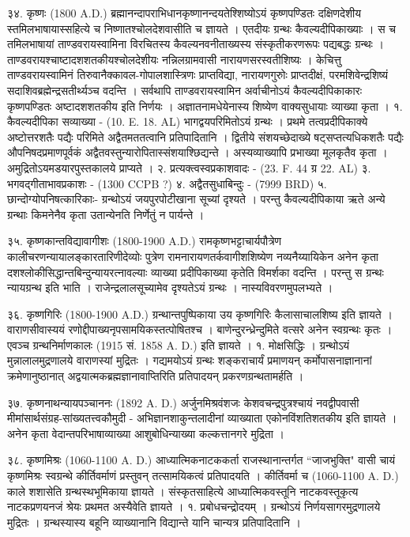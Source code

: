 ३४. कृष्णः (1800 A.D.)
ब्रह्मानन्दापराभिधानकृष्णानन्दयतेश्शिष्योऽयं कृष्णपण्डितः दक्षिणदेशीय स्तमिलभाषायास्सहित्ये च निष्णातश्चोलदेशवासीति च ज्ञायते । एतदीयः ग्रन्थः कैवल्यदीपिकाख्याः
 । स च तमिलभाषायां ताण्डवरायस्वामिना विरचितस्य कैवल्यनवनीताख्यस्य संस्कृतीकरणरूपः पद्यबद्धः ग्रन्थः ।
ताण्डवरायश्चाष्टादशशतकीयश्चोलदेशीयः नन्निलग्रामवासी नारायणसरस्वतीशिष्यः । केचित्तु ताण्डवरायस्वामिनं तिरुवानैक्कावल-गोपालशास्त्रिणः प्राप्तविद्या, नारायणगुरुोः प्राप्तदीक्षं, परमशिवेन्द्रशिष्यं सदाशिवब्रह्मेन्द्रसतीर्थ्यञ्च वदन्ति । सर्वथापि ताण्डवरायस्वामिन अर्वाचीनोऽयं कैवल्यदीपिकाकारः कृष्णपण्डितः अष्टादशशतकीय इति निर्णयः । अज्ञातनामधेयेनास्य शिष्येण वाक्यसुधायाः व्याख्या कृता ।
१. कैवल्यदीपिका सव्याख्या - (10. E. 18. AL)
भागद्वयपरिमितोऽयं ग्रन्थः । प्रथमे तत्वप्रदीपिकाक्ये अष्टोत्तरशतैः पद्यैः परिमिते अद्वैतमततत्वानि प्रतिपादितानि । द्वितीये संशयच्छेदाख्ये षट्सप्तत्यधिकशतैः पद्यैः औपनिषदप्रमाणपूर्वकं अद्वैतवस्तुन्यारोपितास्संशयाश्छिद्यन्ते । अस्यव्याख्यापि प्रभाख्या मूलकृतैव कृता । अमुद्रितोऽयमडयारपुस्तकालये प्राप्यते । 
२. प्रत्यक्त्वस्वप्रकाशवादः - (23. F. 44 ग्र 22. AL)
३. भगवद्गीताभावप्रकाशः - (1300 CCPB ?)
४. अद्वैतसुधाबिन्दुः - (7999 BRD)
५. छान्दोग्योपनिषत्कारिकाः-
ग्रन्थोऽयं जयपुरपोटीखाना सूच्यां दृश्यते । परन्तु कैवल्यदीपिकाया ऋते अन्ये ग्रन्थाः किमनेनैव कृता उतान्येनति निर्णेतुं न पार्यन्ते ।

३५. कृष्णकान्तविद्यावागीशः (1800-1900 A.D.)
रामकृष्णभट्टाचार्यपौत्रेण कालीचरणन्यायालङ्कारतारिणीदेव्योः पुत्रेण रामनारायणतर्कवागीशशिष्येण नव्यनैय्यायिकेन अनेन कृता दशश्लोकीसिद्धान्तबिन्दुन्यायरत्नावल्याः व्याख्या प्रदीपिकाख्या कृतेति विमर्शका वदन्ति । परन्तु स ग्रन्थः न्यायग्रन्थ इति भाति । राजेन्द्रलालसूच्यामेव दृश्यतेऽयं ग्रन्थः । नास्यविवरणमुपलभ्यते ।

३६. कृष्णगिरिः (1800-1900 A.D.)
ग्रन्थान्तपुष्पिकाया उय कृष्णगिरिः कैलासाचालशिष्य इति ज्ञायते । वाराणसीवास्ययं रणोद्दीपाख्यनृपसामयिकस्तत्पोषितश्च । बाणेन्दुरन्ध्रेन्दुमिते वत्सरे अनेन स्वग्रन्थः कृतः । एवञ्च ग्रन्थनिर्माणकालः (1915 सं. 1858 A. D.) इति ज्ञायते ।
१. मोक्षसिद्धिः ।
ग्रन्थोऽयं मुन्नालालमुद्रणालये वाराणस्यां मुद्रितः । गद्यमयोऽयं ग्रन्थः शङ्कराचार्यं प्रमाणयन् कर्मोपासनाज्ञानानां क्रमेणानुष्ठानात् अद्वयात्मकब्रह्मज्ञानावाप्तिरिति प्रतिपादयन् प्रकरणग्रन्थतामर्हति ।

३७. कृष्णनाथन्यायपञ्चाननः (1892 A. D.)
अर्जुनमिश्रवंशजः केशवचन्द्रपुत्रश्चायं नवद्वीपवासी मीमांसार्थसंग्रह-सांख्यतत्त्वकौमुदी - अभिज्ञानशाकुन्तलादीनां व्याख्याता एकोनविंशतिशतकीय इति ज्ञायते । अनेन कृता वेदान्तपरिभाषाव्याख्या आशुबोधिन्याख्या कल्कत्तानगरे मुद्रिता ।

३८. कृष्णमिश्रः (1060-1100 A. D.)
आध्यात्मिकनाटककर्ता राजस्थानान्तर्गत ``जाजभुक्ति" वासी चायं कृष्णमिश्रः स्वग्रन्थे कीर्तिवर्माणं प्रस्तुवन् तत्सामयिकत्वं प्रतिपादयति । कीर्तिवर्मा च (1060-1100 A. D.) काले शशासेति ग्रन्थस्थभूमिकाया ज्ञायते । संस्कृतसाहित्ये आध्यात्मिकवस्तूनि नाटकवस्तूकृत्य नाटकप्रणयनजं श्रेयः प्रथमत अस्यैवेति ज्ञायते ।
१. प्रबोधचन्द्रोदयम् ।
ग्रन्थोऽयं निर्णयसागरमुद्रणालये मुद्रितः । ग्रन्थस्यास्य बहूनि व्याख्यानानि विद्यान्ते यानि चान्यत्र प्रतिपादितानि ।

